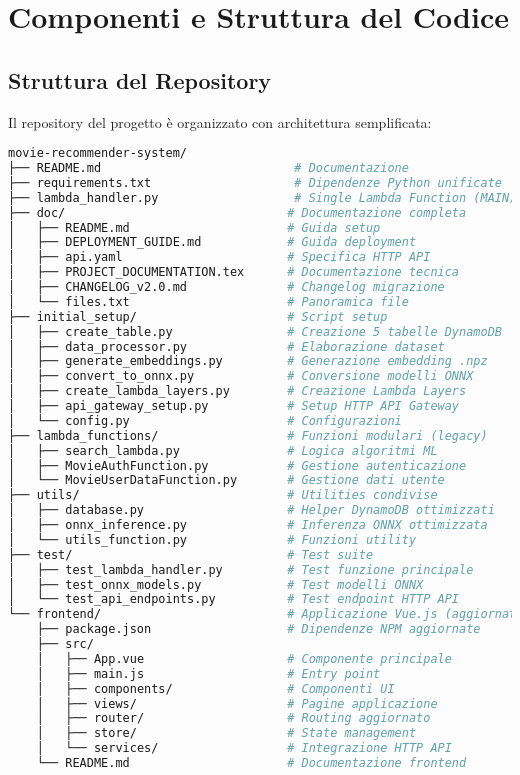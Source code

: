 \documentclass[11pt,a4paper]{article}
\begin{document}
\section{Componenti e Struttura del Codice}
\subsection{Struttura del Repository}
Il repository del progetto è organizzato con architettura semplificata:

\begin{lstlisting}[language=bash]
movie-recommender-system/
├── README.md                           # Documentazione
├── requirements.txt                    # Dipendenze Python unificate
├── lambda_handler.py                   # Single Lambda Function (MAIN)
├── doc/                               # Documentazione completa
│   ├── README.md                      # Guida setup
│   ├── DEPLOYMENT_GUIDE.md            # Guida deployment
│   ├── api.yaml                       # Specifica HTTP API
│   ├── PROJECT_DOCUMENTATION.tex      # Documentazione tecnica
│   ├── CHANGELOG_v2.0.md              # Changelog migrazione
│   └── files.txt                      # Panoramica file
├── initial_setup/                     # Script setup
│   ├── create_table.py                # Creazione 5 tabelle DynamoDB
│   ├── data_processor.py              # Elaborazione dataset
│   ├── generate_embeddings.py         # Generazione embedding .npz
│   ├── convert_to_onnx.py             # Conversione modelli ONNX
│   ├── create_lambda_layers.py        # Creazione Lambda Layers
│   ├── api_gateway_setup.py           # Setup HTTP API Gateway
│   └── config.py                      # Configurazioni
├── lambda_functions/                  # Funzioni modulari (legacy)
│   ├── search_lambda.py               # Logica algoritmi ML
│   ├── MovieAuthFunction.py           # Gestione autenticazione
│   └── MovieUserDataFunction.py       # Gestione dati utente
├── utils/                             # Utilities condivise
│   ├── database.py                    # Helper DynamoDB ottimizzati
│   ├── onnx_inference.py              # Inferenza ONNX ottimizzata
│   └── utils_function.py              # Funzioni utility
├── test/                              # Test suite
│   ├── test_lambda_handler.py         # Test funzione principale
│   ├── test_onnx_models.py            # Test modelli ONNX
│   └── test_api_endpoints.py          # Test endpoint HTTP API
└── frontend/                          # Applicazione Vue.js (aggiornata)
    ├── package.json                   # Dipendenze NPM aggiornate
    ├── src/
    │   ├── App.vue                    # Componente principale
    │   ├── main.js                    # Entry point
    │   ├── components/                # Componenti UI
    │   ├── views/                     # Pagine applicazione
    │   ├── router/                    # Routing aggiornato
    │   ├── store/                     # State management
    │   └── services/                  # Integrazione HTTP API
    └── README.md                      # Documentazione frontend
\end{lstlisting}
\end{document}
